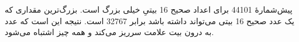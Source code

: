 \section{}
\paragraph{}\label{answer:104}
پیش‌شمارهٔ 44101 برای اعداد صحیح 16 بیتیِ  خیلی بزرگ است. بزرگ‌ترین مقداری که یک عدد صحیح 16 بیتی می‌تواند داشته باشد برابر 32767 است. نتیجه این است که عدد به درون بیت علامت سرریز می‌کند و همه چیز اشتباه می‌شود.